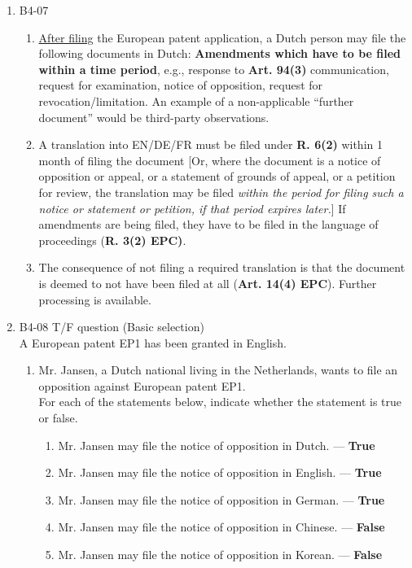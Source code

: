 \documentclass{report}
\begin{document}
\begin{enumerate}[label=\textbf{Answer \arabic*}]
\begin{enumerate}[label=\textbf{Answer \arabic*}]
    \item %
    B4-07
    \begin{enumerate}[label=(\alph*)]
        \item \underline{After filing} the European patent application, a Dutch person may file the following documents in Dutch: \textbf{Amendments which have to be filed within a time period}, e.g., response to \textbf{Art. 94(3)} communication, request for examination, notice of opposition, request for revocation/limitation. An example of a non-applicable ``further document'' would be third-party observations.
        \item A translation into \textsc{EN/DE/FR} must be filed under \textbf{R. 6(2)} within 1 month of filing the document [Or, where the document is a notice of opposition or appeal, or a statement of grounds of appeal, or a petition for review, the translation may be filed \textit{within the period for filing such a notice or statement or petition, if that period expires later.}] If amendments are being filed, they have to be filed in the language of proceedings (\textbf{R. 3(2) EPC)}. 
        \item The consequence of not filing a required translation is that the document is deemed to not have been filed at all (\textbf{Art. 14(4) EPC}). Further processing is available.    \end{enumerate}

    \item %
    B4-08 \quad T/F question (Basic selection) \\
    A European patent EP1 has been granted in English.
    
    \begin{enumerate}[label=(\alph*)]
        \item Mr. Jansen, a Dutch national living in the Netherlands, wants to file an opposition against European patent EP1. \\
        For each of the statements below, indicate whether the statement is true or false.
        \begin{enumerate}[label={(\alph{enumi}.\arabic*)}]
            \item Mr. Jansen may file the notice of opposition in Dutch. --- \textbf{True}
            \item Mr. Jansen may file the notice of opposition in English. --- \textbf{True}
            \item Mr. Jansen may file the notice of opposition in German. --- \textbf{True}
            \item Mr. Jansen may file the notice of opposition in Chinese. --- \textbf{False}
            \item Mr. Jansen may file the notice of opposition in Korean. --- \textbf{False}
        \end{enumerate}
        

\end{enumerate}
\end{enumerate}
\end{enumerate}
\end{document}
